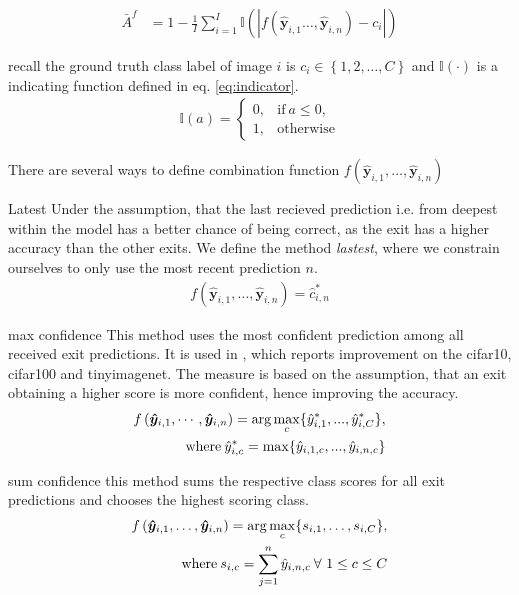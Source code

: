 \begin{enumdescript}
		\begin{align}
		\bar{A}^f &= 1 - \frac{1}{I} \sum_{i=1}^{I}\mathbb{I}\left(\left|f\left(\bm{\hat{y}}_{i,1} \dots, \bm{\hat{y}}_{i,n}\right)-c_i\right|\right)
		\end{align}
		
		recall the ground truth class label of image $ i $ is $ c_i \in \left\{1, 2, \dots, C \right\} $ and $ \mathbb{I(\cdot)}  $ is a indicating function defined in eq. \ref{eq:indicator}.
		\begin{align*}
		\mathbb{I}(a)= \begin{cases}
		0, & \mathrm{if\:} a \leq 0, \\
		1, & \mathrm{otherwise}
		\end{cases}
		\end{align*}
		
		There are several ways to define combination function $ f\left(\bm{\hat{y}}_{i,1}, \dots, \bm{\hat{y}}_{i,n}\right) $
		\begin{enumdescript}
			
			
			\item[Latest] Under the assumption, that the last recieved prediction i.e. from deepest within the model has a better chance of being correct, as the exit has a higher accuracy than the other exits. We define the method \emph{lastest}, where we constrain ourselves to only use the most recent prediction $n$.
			\begin{align}
			f\left(\bm{\hat{y}}_{i,1}, \dots, \bm{\hat{y}}_{i,n} \right) = \hat{c}_{i,n}^{*}
			\end{align}
			
			\item[max confidence] This method uses the most confident prediction among all received exit predictions. It is used in \cite{kaya_shallow-deep_nodate}, which reports improvement on the \gls{cifar10}, \gls{cifar100} and \gls{tinyimagenet}. The measure is based on the assumption, that an exit obtaining a higher score is more confident, hence improving the accuracy.
			\begin{align}
			\begin{split}
			f\left(\bm{\hat{y}}_{i,1}, \cdots, \bm{\hat{y}}_{i,n} \right) =  \arg \underset{c}{\max} \{\hat{y}^*_{i,1}, ..., \hat{y}^*_{i,C} \},
			\\ \text{where\:} \hat{y}^*_{i,c} = \max \{\hat{y}_{i,1,c}, ..., \hat{y}_{i,n,c}\}
			\end{split}	
			\end{align}
			\item[sum confidence] this method sums the respective class scores for all exit predictions and chooses the highest scoring class. 
			\begin{align}
			\begin{split}
			f\left(\bm{\hat{y}}_{i,1}, \dots, \bm{\hat{y}}_{i,n} \right) = \arg \underset{c}{\max} \{s_{i,1}, \dots, s_{i,C}\}, \\ \text{where\:} s_{i,c} = \sum_{j=1}^{n}\hat{y}_{i,n,c}\: \forall \ 1\le c \le C
			\end{split}
			\end{align}
			

\end{enumdescript}
\end{enumdescript}
